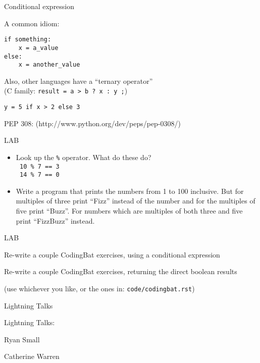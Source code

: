 \documentclass{beamer}
\begin{document}
\begin{frame}[fragile]{Conditional expression}

{\large A common idiom:}
\begin{verbatim}
if something:
    x = a_value
else:
    x = another_value
\end{verbatim}
\vfill
{\large Also, other languages have a ``ternary operator''}\\
\hspace{0.2in}(C family: \verb|result = a > b ? x : y ;|)

\vfill
{ \Large \verb|y = 5 if x > 2 else 3| }

\vfill
{\large PEP 308:}
(http://www.python.org/dev/peps/pep-0308/)

\end{frame}



\begin{frame}[fragile]{LAB}

\begin{itemize}
  \item Look up the \verb+%+ operator. What do these do?\\
    \verb| 10 % 7 == 3 | \\
    \verb| 14 % 7 == 0 |
  \item  Write a program that prints the numbers from 1 to 100 inclusive.
But for multiples of three print ``Fizz'' instead of the number and for the
multiples of five print ``Buzz''. For numbers which are multiples of both three
and five print ``FizzBuzz'' instead.
\end{itemize}

\end{frame}

\begin{frame}[fragile]{LAB}

\vfill
{\large Re-write a couple CodingBat exercises, using a conditional expression}


\vfill
{\large Re-write a couple CodingBat exercises, returning the direct boolean results}

\vfill
{\large (use whichever you like, or the ones in: \verb|code/codingbat.rst|)}

\end{frame}

\begin{frame}[fragile]{Lightning Talks}

{\LARGE Lightning Talks:}

\vfill
Ryan Small

\vfill
Catherine Warren 


\end{frame}
\end{document}
